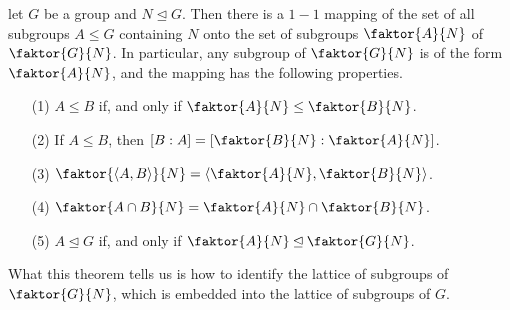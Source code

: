 \begin{theorem}\label{theorem_3.4.2}
  let $G$ be a group and  $N \unlhd G$. Then there is a  $1-1$ mapping of the
  set of all subgroups  $A \leq G$ containing $N$ onto the set of subgroups
  $\faktor{A}{N}$ of $\faktor{G}{N}$. In particular, any subgroup of
  $\faktor{G}{N}$ is of the form $\faktor{A}{N}$, and the mapping has the
  following properties.
  \begin{enumerate}
    \item[(1)] $A \leq B$ if, and only if  $\faktor{A}{N} \leq \faktor{B}{N}$.

    \item[(2)] If $A \leq B$, then  $[B:A]=[\faktor{B}{N} : \faktor{A}{N}]$.

    \item[(3)] $\faktor{\langle A,B \rangle}{N}=\langle \faktor{A}{N},
      \faktor{B}{N} \rangle$.

    \item[(4)] $\faktor{A \cap B}{N}=\faktor{A}{N} \cap \faktor{B}{N}$.

    \item[(5)] $A \unlhd G$ if, and only if  $\faktor{A}{N} \unlhd
      \faktor{G}{N}$.
  \end{enumerate}
\end{theorem}
\begin{remark}
  What this theorem tells us is how to identify the lattice of subgroups of
  $\faktor{G}{N}$, which is embedded into the lattice of subgroups of $G$.
\end{remark}

